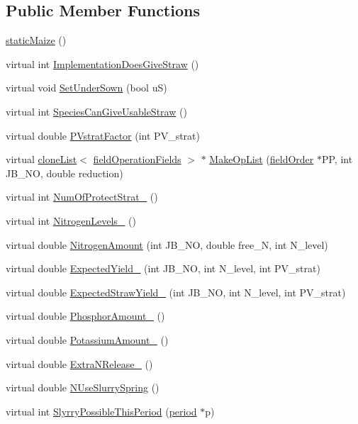 \subsection*{Public Member Functions}
\begin{DoxyCompactItemize}
\item 
\hyperlink{classstatic_maize_a20270eacb7bcfd32722a00ba5b7cc8d3}{staticMaize} ()
\item 
virtual int \hyperlink{classstatic_maize_a4b48acc64147a6c46ee154570c65b2fe}{ImplementationDoesGiveStraw} ()
\item 
virtual void \hyperlink{classstatic_maize_a63e7d361f819155d45d3df7a67a7813d}{SetUnderSown} (bool uS)
\item 
virtual int \hyperlink{classstatic_maize_a7d5badef27f557d91fe682c764f1b27a}{SpeciesCanGiveUsableStraw} ()
\item 
virtual double \hyperlink{classstatic_maize_a8a64240f6fed1b843e9d9521dad59231}{PVstratFactor} (int PV\_\-strat)
\item 
virtual \hyperlink{classclone_list}{cloneList}$<$ \hyperlink{classfield_operation_fields}{fieldOperationFields} $>$ $\ast$ \hyperlink{classstatic_maize_a57e27a95b36604807c2eed91446df668}{MakeOpList} (\hyperlink{classfield_order}{fieldOrder} $\ast$PP, int JB\_\-NO, double reduction)
\item 
virtual int \hyperlink{classstatic_maize_afc493353ee7d925a708506e8738eea5f}{NumOfProtectStrat\_\-} ()
\item 
virtual int \hyperlink{classstatic_maize_aa09f67751bfbfe9a3e7e414cffaab133}{NitrogenLevels\_\-} ()
\item 
virtual double \hyperlink{classstatic_maize_adafefb969922559e085bbe97b7406eb9}{NitrogenAmount} (int JB\_\-NO, double free\_\-N, int N\_\-level)
\item 
virtual double \hyperlink{classstatic_maize_ac5efafeda6da275fff56a9bf1fa1c2a6}{ExpectedYield\_\-} (int JB\_\-NO, int N\_\-level, int PV\_\-strat)
\item 
virtual double \hyperlink{classstatic_maize_a4aa3fc3917c90262a603de13f0fb4c67}{ExpectedStrawYield\_\-} (int JB\_\-NO, int N\_\-level, int PV\_\-strat)
\item 
virtual double \hyperlink{classstatic_maize_a521e65129a55f99bc810e26bdf7041ce}{PhosphorAmount\_\-} ()
\item 
virtual double \hyperlink{classstatic_maize_a3b0031d7c36e7f11f4ca81ece845c63c}{PotassiumAmount\_\-} ()
\item 
virtual double \hyperlink{classstatic_maize_a251634ed082e4b2cdbe0d16bb53b54cd}{ExtraNRelease\_\-} ()
\item 
virtual double \hyperlink{classstatic_maize_a4054559a82f50ce5bb73091de2aed6f6}{NUseSlurrySpring} ()
\item 
virtual int \hyperlink{classstatic_maize_ac7221669f33010383e88c2cc74d02c57}{SlyrryPossibleThisPeriod} (\hyperlink{classperiod}{period} $\ast$p)
\end{DoxyCompactItemize}
